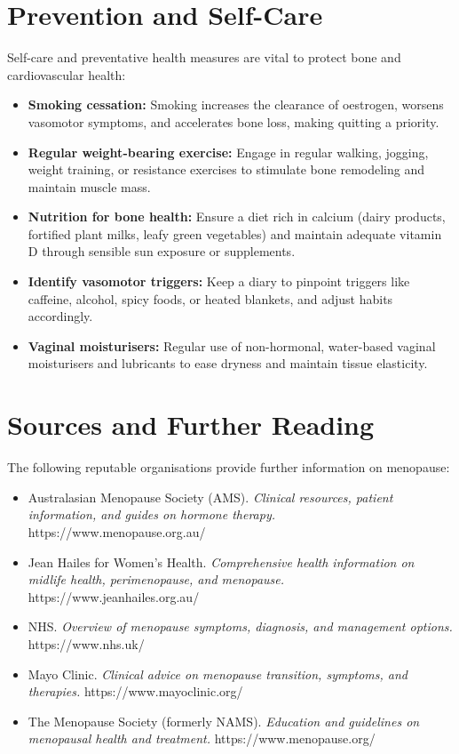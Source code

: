 \section*{Prevention and Self-Care}
Self-care and preventative health measures are vital to protect bone and cardiovascular health:
\begin{itemize}
    \item \textbf{Smoking cessation:} Smoking increases the clearance of oestrogen, worsens vasomotor symptoms, and accelerates bone loss, making quitting a priority.
    \item \textbf{Regular weight-bearing exercise:} Engage in regular walking, jogging, weight training, or resistance exercises to stimulate bone remodeling and maintain muscle mass.
    \item \textbf{Nutrition for bone health:} Ensure a diet rich in calcium (dairy products, fortified plant milks, leafy green vegetables) and maintain adequate vitamin D through sensible sun exposure or supplements.
    \item \textbf{Identify vasomotor triggers:} Keep a diary to pinpoint triggers like caffeine, alcohol, spicy foods, or heated blankets, and adjust habits accordingly.
    \item \textbf{Vaginal moisturisers:} Regular use of non-hormonal, water-based vaginal moisturisers and lubricants to ease dryness and maintain tissue elasticity.
\end{itemize}

\section*{Sources and Further Reading}
The following reputable organisations provide further information on menopause:
\begin{itemize}
    \item Australasian Menopause Society (AMS). \textit{Clinical resources, patient information, and guides on hormone therapy.} https://www.menopause.org.au/
    \item Jean Hailes for Women's Health. \textit{Comprehensive health information on midlife health, perimenopause, and menopause.} https://www.jeanhailes.org.au/
    \item NHS. \textit{Overview of menopause symptoms, diagnosis, and management options.} https://www.nhs.uk/
    \item Mayo Clinic. \textit{Clinical advice on menopause transition, symptoms, and therapies.} https://www.mayoclinic.org/
    \item The Menopause Society (formerly NAMS). \textit{Education and guidelines on menopausal health and treatment.} https://www.menopause.org/
\end{itemize}


